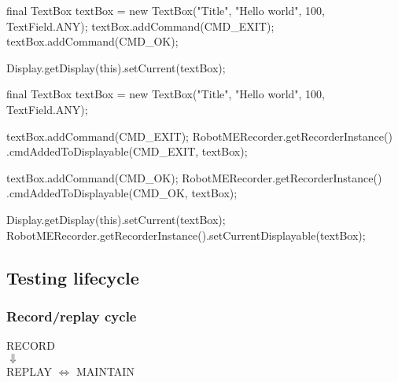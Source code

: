 \documentclass[compress,notes=hide]{beamer}
\begin{document}
\begin{frame}

\begin{javablock}
final TextBox textBox = new TextBox("Title", 
  "Hello world", 100, TextField.ANY);
textBox.addCommand(CMD_EXIT);
textBox.addCommand(CMD_OK);

Display.getDisplay(this).setCurrent(textBox);
\end{javablock}

\begin{javablock}
final TextBox textBox = new TextBox("Title", 
  "Hello world", 100, TextField.ANY);

textBox.addCommand(CMD_EXIT);
RobotMERecorder.getRecorderInstance()
  .cmdAddedToDisplayable(CMD_EXIT, textBox);

textBox.addCommand(CMD_OK);
RobotMERecorder.getRecorderInstance()
  .cmdAddedToDisplayable(CMD_OK, textBox);

Display.getDisplay(this).setCurrent(textBox);
RobotMERecorder.getRecorderInstance().setCurrentDisplayable(textBox);
\end{javablock}


\end{frame}

\subsection{Testing lifecycle} %

\begin{frame}
    \frametitle{Record/replay cycle}

    \begin{center}\large
        RECORD\\
        $\Downarrow$\\
        REPLAY $\Leftrightarrow$ MAINTAIN
    \end{center}
    
\end{frame}
\end{document}
